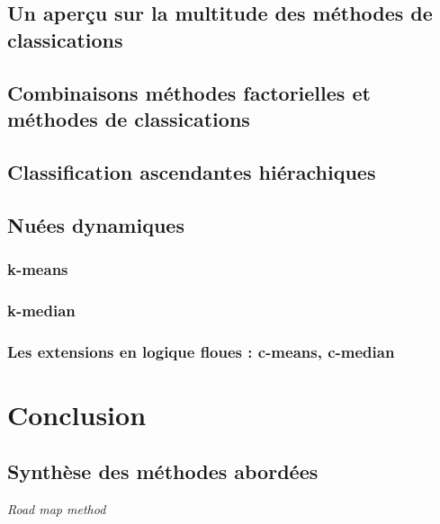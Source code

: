 \documentclass[
  11pt,
  french,
]{book}
\begin{document}
\hypertarget{sect101}{%
\section{Un aperçu sur la multitude des méthodes de classications}\label{sect101}}

\hypertarget{sect102}{%
\section{Combinaisons méthodes factorielles et méthodes de classications}\label{sect102}}

\hypertarget{sect103}{%
\section{Classification ascendantes hiérachiques}\label{sect103}}

\hypertarget{sect104}{%
\section{Nuées dynamiques}\label{sect104}}

\hypertarget{sect1041}{%
\subsection{k-means}\label{sect1041}}

\hypertarget{sect1042}{%
\subsection{k-median}\label{sect1042}}

\hypertarget{sect1043}{%
\subsection{Les extensions en logique floues : c-means, c-median}\label{sect1043}}

\hypertarget{conclusion}{%
\chapter{Conclusion}\label{conclusion}}

\hypertarget{sect111}{%
\section{Synthèse des méthodes abordées}\label{sect111}}

\emph{Road map method}
\end{document}
